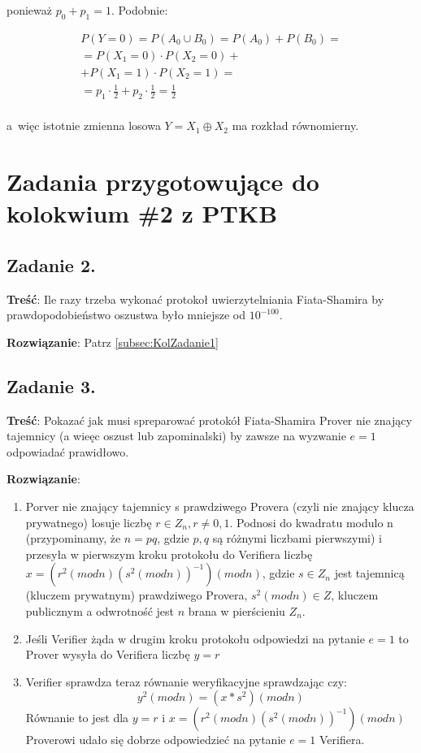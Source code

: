 \documentclass[a4paper,10pt, twocolumn]{article}
\begin{document}
\noindent ponieważ $p_{0} + p_{1} = 1$. Podobnie:

\begin{equation*}
	\begin{array}{c} P(Y = 0) = P(A_{0} \cup B_{0}) = P(A_{0}) + P(B_{0}) = \\ = P(X_{1} = 0) \cdot P(X_{2} = 0) + \\ + P(X_{1} = 1) \cdot P(X_{2} = 1) = \\ = p_{1} \cdot \frac{1}{2} + p_{2} \cdot \frac{1}{2} = \frac{1}{2} \\ \end{array}
\end{equation*}

\noindent a~więc istotnie zmienna losowa $Y = X_{1} \oplus X_{2}$ ma rozkład równomierny.

\section{Zadania przygotowujące do kolokwium \#2 z PTKB}

\subsection{Zadanie 2.}
\textbf{Treść}: Ile razy trzeba wykonać protokoł uwierzytelniania Fiata-Shamira by prawdopodobieństwo oszustwa było mniejsze od $10^{-100}$.

\textbf{Rozwiązanie}: Patrz \ref{subsec:KolZadanie1}

\subsection{Zadanie 3.}
\textbf{Treść}: Pokazać jak musi spreparować protokół Fiata-Shamira Prover nie znający tajemnicy (a wieęc oszust lub zapominalski) by zawsze na wyzwanie $e=1$ odpowiadać prawidłowo.

\textbf{Rozwiązanie}: 
\begin{enumerate}
	\item Porver nie znający tajemnicy s prawdziwego Provera (czyli nie znający klucza prywatnego) losuje liczbę $r\in Z_n, r\neq 0,1$. Podnosi do kwadratu modulo n (przypominamy, że $n=pq$, gdzie $p,q$ są różnymi liczbami pierwszymi) i przesyła w pierwszym kroku protokołu do Verifiera liczbę $x=(r^2(modn){(s^2(modn))}^{-1})(modn)$, gdzie $s \in Z_n$ jest tajemnicą (kluczem prywatnym) prawdziwego Provera, $s^2(modn)\in Z$, kluczem publicznym a odwrotność jest $n$ brana w pierścieniu $Z_n$.
	\item Jeśli Verifier żąda w drugim kroku protokołu odpowiedzi na pytanie $e=1$ to Prover wysyła do Verifiera liczbę $y=r$
	\item Verifier sprawdza teraz równanie weryfikacyjne sprawdzając czy:
		\begin{equation*}
			y^2(modn)=(x*s^2)(modn)
		\end{equation*}
		Równanie to jest dla $y=r$ i $x=(r^2(modn){(s^2(modn))}^{-1})(modn)$
		Proverowi udało się dobrze odpowiedzieć na pytanie $e=1$ Verifiera.
\end{enumerate}
\end{document}
